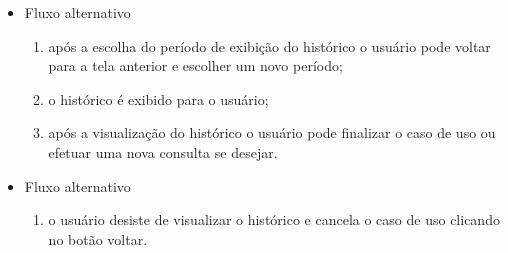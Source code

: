 \begin{itemize}
\begin{itemize}
		    \item Fluxo alternativo
			    \begin{enumerate}
			        \item após a escolha do período de exibição do histórico o usuário pode voltar para a tela anterior e escolher um novo período;
			        \item o histórico é exibido para o usuário;
			        \item após a visualização do histórico o usuário pode finalizar o caso de uso ou efetuar uma nova consulta se desejar.
			    \end{enumerate}

		    \item Fluxo alternativo
			    \begin{enumerate}
			        \item o usuário desiste de visualizar o histórico e cancela o caso de uso clicando no botão voltar.
			    \end{enumerate}
		\end{itemize}
\end{itemize}